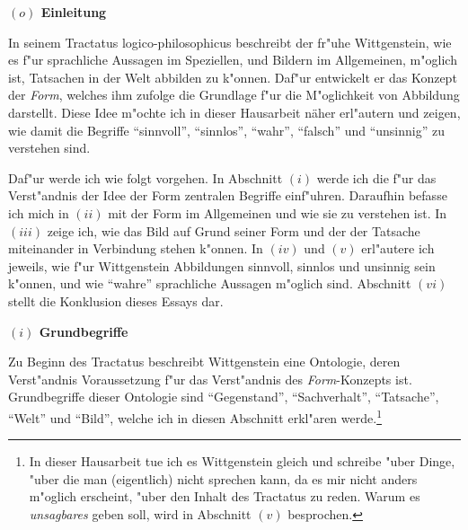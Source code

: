 \documentclass[a4paper, emulatestandardclasses, 12pt]{scrartcl}
\begin{document}
\begin{onehalfspace} 



\noindent\textbf{$(o)$ Einleitung}

\noindent In seinem Tractatus logico-philosophicus \citep{wittgenstein1963tractatus} beschreibt der fr"uhe Wittgenstein, wie es f"ur sprachliche Aussagen im Speziellen, und Bildern im Allgemeinen, m"oglich ist, Tatsachen in der Welt abbilden zu k"onnen. Daf"ur entwickelt er das Konzept der \emph{Form}, welches ihm zufolge die Grundlage f"ur die M"oglichkeit von Abbildung darstellt. Diese Idee m"ochte ich in dieser Hausarbeit näher erl"autern und zeigen, wie damit die Begriffe "`sinnvoll"', "`sinnlos"', "`wahr"', "`falsch"' und "`unsinnig"' zu verstehen sind.

Daf"ur werde ich wie folgt vorgehen. In Abschnitt $(i)$ werde ich die f"ur das Verst"andnis der Idee der Form zentralen Begriffe einf"uhren. Daraufhin befasse ich mich in $(ii)$ mit der Form im Allgemeinen und wie sie zu verstehen ist. In $(iii)$ zeige ich, wie das Bild auf Grund seiner Form und der der Tatsache miteinander in Verbindung stehen k"onnen. In $(iv)$ und $(v)$ erl"autere ich jeweils, wie f"ur Wittgenstein Abbildungen sinnvoll, sinnlos und unsinnig sein k"onnen, und wie "`wahre"' sprachliche Aussagen m"oglich sind. Abschnitt $(vi)$ stellt die Konklusion dieses Essays dar.
\vspace{5mm}



\noindent\textbf{$(i)$ Grundbegriffe}

\noindent Zu Beginn des Tractatus beschreibt Wittgenstein eine Ontologie, deren Verst"andnis Voraussetzung f"ur das Verst"andnis des \emph{Form}-Konzepts ist. Grundbegriffe dieser Ontologie sind "`Gegenstand"', "`Sachverhalt"', "`Tatsache"', "`Welt"' und "`Bild"', welche ich in diesen Abschnitt erkl"aren werde.\footnote{In dieser Hausarbeit tue ich es Wittgenstein gleich und schreibe "uber Dinge, "uber die man (eigentlich) nicht sprechen kann, da es mir nicht anders m"oglich erscheint, "uber den Inhalt des Tractatus zu reden. Warum es \emph{unsagbares} geben soll, wird in Abschnitt $(v)$ besprochen.}


\end{onehalfspace}
\end{document}
